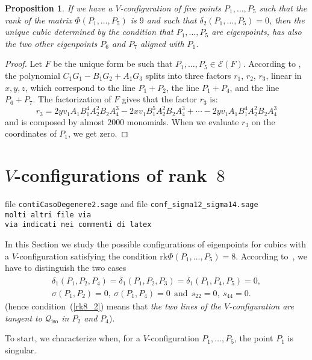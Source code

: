 \documentclass{amsart}
\theoremstyle{plain}
\newtheorem{prop}[lemma]{Proposition}
\theoremstyle{definition}
\newcommand{\iso}{\mathcal{Q}_{\mathrm{iso}}}
\newcommand{\Eig}[1]{\mathcal{E}\!\left( {#1} \right)}
\newcommand{\rk}{\ensuremath{\mathrm{rk}}}
\begin{document}
%
\begin{prop}
\label{proposition:terzo_allineamento}
If we have a $V$-configuration of five points $P_1, \dots, P_5$
such that the rank of the matrix $\Phi(P_1, \dots, P_5)$ is $9$ and
such that $\delta_2(P_1, \dots, P_5) = 0$,
then the unique cubic determined by the condition that $P_1, \dots, P_5$
are eigenpoints, has also the two other eigenpoints $P_6$ and $P_7$
aligned with $P_1$.
\end{prop}
\begin{proof}
Let $F$ be the unique form be such that $P_1, \dotsc, P_5 \in \Eig{F}$.
According to , the polynomial
$C_1G_1-B_1G_2+A_1G_3$ splits into three factors $r_1$, $r_2$, $r_3$,
linear in $x, y, z$, which
correspond to the line $P_1+P_2$, the line $P_1+P_4$, and the line $P_6+P_7$.
The factorization of $F$ gives that the factor $r_3$ is:
\[
r_3 = 2yv_1A_1B_1^4A_2^2B_2A_4^3-2xv_1B_1^5A_2^2B_2A_4^3+\cdots
-2 yv_1A_1B_1^4A_2^2B_2A_4^3
\]
and is composed by almost $2000$ monomials. When we
evaluate $r_3$ on the coordinates of $P_1$, we get zero.
\end{proof}

\section{$V$-configurations of rank~$8$}
\label{rank_8}
file \verb+contiCasoDegenere2.sage+ and file
\verb+conf_sigma12_sigma14.sage+\\
\verb+molti altri file via +\\
\verb+via indicati nei commenti di latex+

In this Section we study the possible configurations of
eigenpoints for cubics with a $V$-configuration
satisfying the condition $\rk \Phi(P_1, \dots, P_5) = 8$. According
to~, we have to distinguish the two cases
\begin{eqnarray}
\delta_1(P_1, P_2, P_4)=\overline{\delta}_1(P_1, P_2, P_3) =
\overline{\delta}_1(P_1, P_4, P_5) = 0,
\label{rk8_1}\\
\sigma(P_1, P_2) = 0, \  \sigma(P_1, P_4) = 0 \ \ \mbox{and} \ \ s_{22} = 0,
\  s_{44} = 0.
\label{rk8_2}
\end{eqnarray}
(hence condition~(\ref{rk8_2}) means that \emph{the two lines of
the $V$-configuration are tangent to $\iso$ in $P_2$ and $P_4$}).

To start, we characterize when, for a $V$-configuration
$P_1, \dotsc, P_5$, the point $P_1$ is singular.
\end{document}
